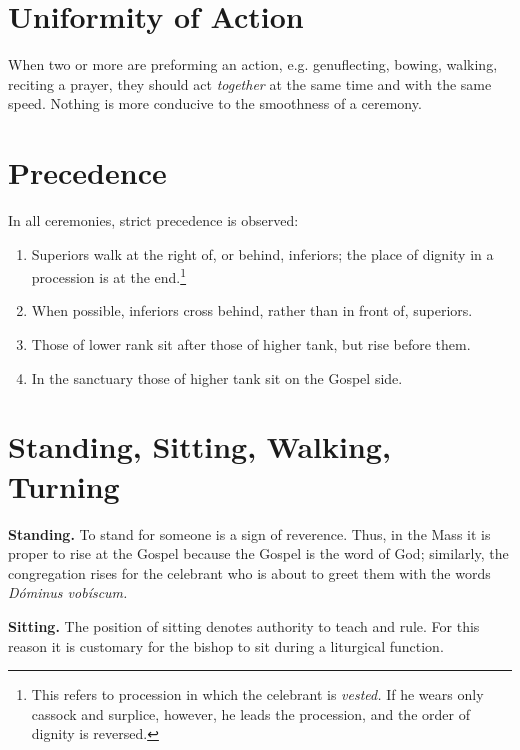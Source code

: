 \documentclass{report}
\begin{document}

\section{Uniformity of Action}

\rubric When two or more are preforming an action, e.g. genuflecting, bowing,
walking, reciting a prayer, they should act \textit{together} at the same time
and with the same speed. Nothing is more conducive to the smoothness of a
ceremony.

\section{Precedence}

\rubric In all ceremonies, strict precedence is observed:

\begin{enumerate}

    \item Superiors walk at the right of, or behind, inferiors; the place of
        dignity in a procession is at the end.\footnote{This refers to
        procession in which the celebrant is \textit{vested.} If he wears only
        cassock and surplice, however, he leads the procession, and the order
        of dignity is reversed.}

    \item When possible, inferiors cross behind, rather than in front of,
        superiors.

    \item Those of lower rank sit after those of higher tank, but rise before
        them.

    \item In the sanctuary those of higher tank sit on the Gospel side.

\end{enumerate}

\section{Standing, Sitting, Walking, Turning}

\rubric \textbf{Standing.} To stand for someone is a sign of reverence. Thus,
in the Mass it is proper to rise at the Gospel because the Gospel is the word
of God; similarly, the congregation rises for the celebrant who is about to
greet them with the words \textit{Dóminus vobíscum.}

\rubric \textbf{Sitting.} The position of sitting denotes authority to teach
and rule. For this reason it is customary for the bishop to sit during a
liturgical function.
\end{document}
